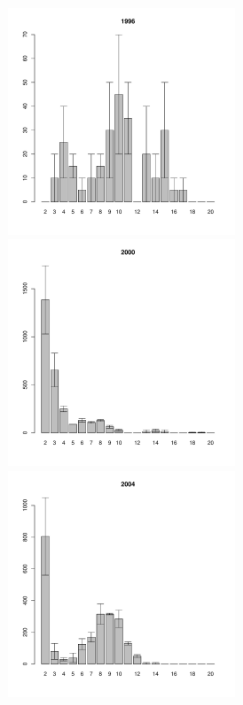 \begin{figure}[hp]
	\begin{minipage}[b]{.3\linewidth}
	\begin{center}
\includegraphics[width=60mm]{../White_Sea/Ryashkov_ZRS/zrs2_1996_.pdf}
	\end{center}
	\end{minipage}
	\hfill
	\begin{minipage}[b]{.3\linewidth}
	\begin{center}
	\includegraphics[width=60mm]{../White_Sea/Ryashkov_ZRS/zrs2_2000_.pdf}
	\end{center}
	\end{minipage}	
	\hfill
	\begin{minipage}[b]{.3\linewidth}
	\begin{center}
	\includegraphics[width=60mm]{../White_Sea/Ryashkov_ZRS/zrs2_2004_.pdf}
	\end{center}
	\end{minipage}


\end{figure}
